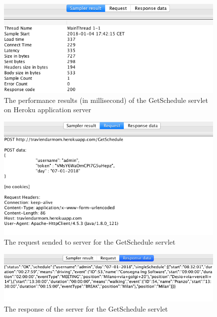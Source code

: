\documentclass[numbers=noenddot, 12pt, a4paper, oneside]{scrbook}
\begin{document}
\begin{figure}[H]
	\centering
	\includegraphics[width=1.1\textwidth]{Test/GetScheduleMain}
	\caption{The performance results (in millisecond) of the GetSchedule servlet on Heroku application server}
\end{figure}

\begin{figure}[H]
	\centering
	\includegraphics[width=1.1\textwidth]{Test/GetScheduleReq}
	\caption{The request sended to server for the GetSchedule servlet}
\end{figure}

\begin{figure}[H]
	\centering
	\includegraphics[width=1.1\textwidth]{Test/GetScheduleResp}
	\caption{The response of the server for the GetSchedule servlet}
\end{figure}
\end{document}
